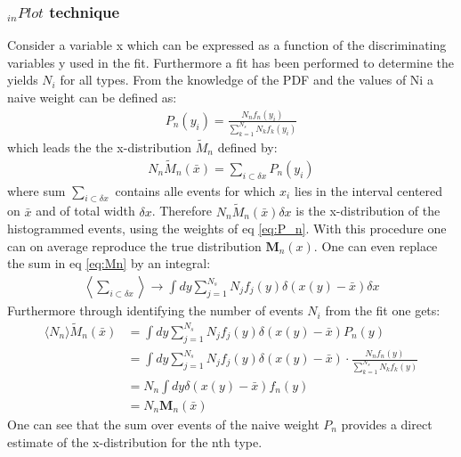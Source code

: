 \documentclass[english]{uzhpub}
\begin{document}
 \subsubsection*{$_{in} Plot$ technique}
Consider a variable x which can be expressed as a function of the discriminating variables y used in the fit. Furthermore a fit has been performed to determine the yields $N_i$ for all types. From the knowledge of the PDF and the values of Ni a naive weight can be defined as:
 \begin{align}
  P_n(y_i) = \frac{N_n f_n(y_i)}{\sum_{k=1}^{N_s} N_k f_k(y_i)} \label{eq:P_n}
 \end{align}
which leads the the x-distribution $\tilde{M}_n$ defined by:
 \begin{align}
  N_n \tilde{M}_n (\bar{x}) = \sum_{i \subset \delta x} P_n (y_i) \label{eq:Mn}
 \end{align}
 where sum $\sum_{i \subset \delta x}$ contains alle events for which $x_i$ lies in the interval centered on $\bar{x}$ and of total width $\delta x$.
 Therefore $N_n \tilde{M}_n (\bar{x}) \delta x$ is the x-distribution of the histogrammed events, using the weights of eq \ref{eq:P_n}.
 With this procedure one can on average reproduce the true distribution $\textbf{M}_n(x)$. One can even replace the sum in eq \ref{eq:Mn} by an integral:
 \begin{align}
  \left \langle \sum_{i \subset \delta x} \right \rangle \rightarrow \int dy \sum_{j=1}^{N_s} N_j f_j (y) \delta (x(y) - \bar{x}) \delta x \label{eq:average}
 \end{align}
 Furthermore through identifying the number of events $N_i$ from the fit one gets:
 \begin{align}
  \langle N_n \rangle \tilde{M}_n (\bar{x}) & = \int dy \sum_{j=1}^{N_s} N_j f_j (y) \delta (x(y) - \bar{x}) P_n (y)                                               \\
                                            & = \int dy \sum_{j=1}^{N_s} N_j f_j (y) \delta (x(y)- \bar{x}) \cdot \frac{N_n f_n (y)}{\sum_{k=1}^{N_s} N_k f_k (y)} \\
                                            & = N_n \int dy \delta (x(y) - \bar{x}) f_n (y)                                                                        \\
                                            & = N_n \textbf{M}_n(\bar{x}) \label{eq:N_nM_n}
 \end{align}
 One can see that the sum over events of the naive weight $P_n$ provides a direct estimate of the x-distribution for the nth type.
\end{document}
